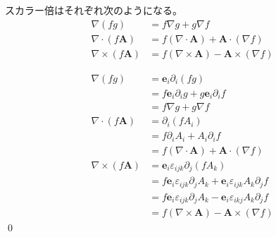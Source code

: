 \documentclass[uplatex,dvipdfmx,a4paper,11pt]{jlreq}
\makeatletter
\newcommand{\ee}{\bm{e}}
\newcommand{\grad}{\nabla}
\renewcommand{\div}{\nabla\cdot}
\newcommand{\rot}{\nabla\times}
\theoremstyle{definition}
\renewenvironment{proof}[1][\proofname]{\par
  \normalfont
  \topsep6\p@\@plus6\p@ \trivlist
  \item[\hskip\labelsep{\bfseries #1}\@addpunct{\bfseries}]\ignorespaces\quad\par
}{%
  \qed\endtrivlist\@endpefalse
}
\renewcommand\proofname{証明}
\makeatother
\begin{document}
\begin{theorem}[スカラー倍の勾配・発散・回転]
  スカラー倍はそれぞれ次のようになる。
  \begin{align}
    \grad{(fg)}     & = f\grad{g} + g\grad{f}                    \\
    \div{(f\bm{A})} & = f(\div{\bm{A}}) + \bm{A}\cdot(\grad{f})  \\
    \rot{(f\bm{A})} & = f(\rot{\bm{A}}) - \bm{A}\times(\grad{f})
  \end{align}
\end{theorem}
\begin{proof}
  \begin{align}
    \grad{(fg)}     & = \ee_i\partial_i(fg)                                                         \\
                    & = f\ee_i\partial_i g + g\ee_i\partial_i f                                     \\
                    & = f\grad{g} + g\grad{f}                                                       \\
    \div{(f\bm{A})} & = \partial_i(fA_i)                                                            \\
                    & = f\partial_iA_i + A_i\partial_if                                             \\
                    & = f(\div{\bm{A}}) + \bm{A}\cdot(\grad{f})                                     \\
    \rot{(f\bm{A})} & = \ee_i\varepsilon_{ijk}\partial_j(fA_k)                                      \\
                    & = f\ee_i\varepsilon_{ijk}\partial_jA_k + \ee_i\varepsilon_{ijk}A_k\partial_jf \\
                    & = f\ee_i\varepsilon_{ijk}\partial_jA_k - \ee_i\varepsilon_{ikj}A_k\partial_jf \\
                    & = f(\rot{\bm{A}}) - \bm{A}\times(\grad{f})
  \end{align}
\end{proof}
\end{document}
